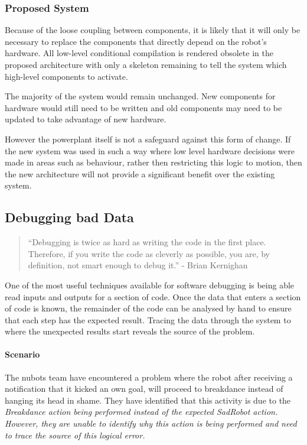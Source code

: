 \documentclass[english,12pt]{scrartcl}
\begin{document}
			\subsubsection{Proposed System}
				Because of the loose coupling between components, it is likely that it will only be necessary to replace the components that directly depend on the robot’s hardware.
				All low-level conditional compilation is rendered obsolete in the proposed architecture with only a skeleton remaining to tell the system which high-level components to activate.
				
				The majority of the system would remain unchanged. New components for hardware would still need to be written and old components may need to be updated to take advantage of new hardware.
				
				However the \gls{powerplant} itself is not a safeguard against this form of change. If the new system was used in such a way where low level hardware decisions were made in areas such as behaviour, rather then restricting this logic to motion, then the new architecture will not provide a significant benefit over the existing system.

		\subsection{Debugging bad Data}
			\begin{quote}``Debugging is twice as hard as writing the code in the first place. Therefore, if you write the code as cleverly as possible, you are, by definition, not smart enough to debug it.'' - Brian Kernighan\end{quote}
			One of the most useful techniques available for software debugging is being able read inputs and outputs for a section of code. Once the data that enters a section
			of code is known, the remainder of the code can be analysed by hand to ensure that each
			step has the expected result. Tracing the data through the system to where the unexpected results start reveals the source of the problem.

			\paragraph{Scenario} The \gls{nubots} team have encountered a problem where the robot after
			receiving a notification that it kicked an own goal, will proceed to breakdance instead
			of hanging its head in shame. They have identified that this activity is due to the
			\em{Breakdance} action being performed instead of the expected \em{SadRobot} action. However, they are unable to identify why this action is being performed and need to trace the source
			of this logical error.
\end{document}
